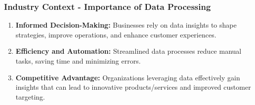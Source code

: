 \documentclass{beamer}
\begin{document}
\begin{frame}[fragile]
    \frametitle{Industry Context - Importance of Data Processing}
    \begin{enumerate}
        \item \textbf{Informed Decision-Making:} Businesses rely on data insights to shape strategies, improve operations, and enhance customer experiences.
        
        \item \textbf{Efficiency and Automation:} Streamlined data processes reduce manual tasks, saving time and minimizing errors.
        
        \item \textbf{Competitive Advantage:} Organizations leveraging data effectively gain insights that can lead to innovative products/services and improved customer targeting.
    \end{enumerate}
\end{frame}
\end{document}
